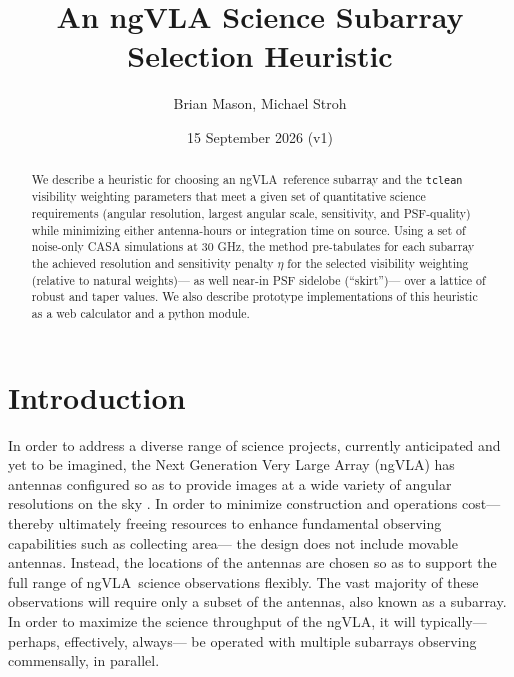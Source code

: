 \documentclass[11pt]{article}
\title{An ngVLA Science Subarray Selection Heuristic}
\author{Brian Mason, Michael Stroh}
\date{15 September 2026 (v1)}
\newcommand{\ngvla}{ngVLA}
\begin{document}
\maketitle

\begin{abstract}
  We describe a heuristic for choosing an \ngvla\ reference
  subarray and the {\tt tclean} visibility weighting parameters that
  meet a given set of quantitative science requirements (angular
  resolution, largest angular scale, sensitivity, and PSF-quality)
  while minimizing either antenna-hours or integration time on source.
  Using a set of noise-only CASA simulations at 30 GHz, the method
  pre-tabulates for each subarray the achieved resolution and
  sensitivity penalty $\eta$ for the selected visibility weighting
  (relative to natural weights)--- as well near-in PSF sidelobe
  (``skirt'')--- over a lattice of robust and taper values. We also
  describe prototype implementations of this heuristic as a web calculator
  and a python module.
\end{abstract}

\section{Introduction}
\label{sec:intro}

In order to address a diverse range of science projects, currently
anticipated and yet to be imagined, the Next Generation Very Large
Array (\ngvla) has antennas configured so as to provide images at a
wide variety of angular resolutions on the sky
\citep{configDescription,memo106}.  In order to minimize construction
and operations cost--- thereby ultimately freeing resources to enhance
fundamental observing capabilities such as collecting area--- the
design does not include movable antennas.  Instead, the locations of
the antennas are chosen so as to support the full range of \ngvla\
science observations flexibly.  The vast majority of these
observations will require only a subset of the antennas, also known as
a subarray.  In order to maximize the science throughput of the
\ngvla, it will typically--- perhaps, effectively, always--- be
operated with multiple subarrays observing commensally, in parallel.
\end{document}

